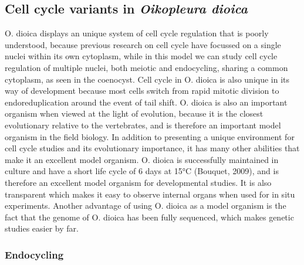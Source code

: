 \documentclass[11pt,twoside,a4paper]{report}
\begin{document}
		\subsection{Cell cycle variants in \textit{Oikopleura dioica}}
		\label{subsection:CellCycleVariants}
		O. dioica displays an unique system of cell cycle regulation that is poorly understood, because previous research on cell cycle have focussed on a single nuclei within its own cytoplasm, while in this model we can study cell cycle regulation of multiple nuclei, both meiotic and endocycling, sharing a common cytoplasm, as seen in the coenocyst. Cell cycle in O. dioica is also unique in its way of development because most cells switch from rapid mitotic division to endoreduplication around the event of tail shift. O. dioica is also an important organism when viewed at the light of evolution, because it is the closest evolutionary relative to the vertebrates, and is therefore an important model organism in the field biology. In addition to presenting a unique environment for cell cycle studies and its evolutionary importance, it has many other abilities that make it an excellent model organism. O. dioica is successfully maintained in culture and have a short life cycle of 6 days at 15°C (Bouquet, 2009), and is therefore an excellent model organism for developmental studies. It is also transparent which makes it easy to observe internal organs when used for in situ experiments. Another advantage of using O. dioica as a model organism is the fact that the genome of O. dioica has been fully sequenced, which makes genetic studies easier by far.
		
		
		\subsubsection{Endocycling}
		
		
\end{document}
